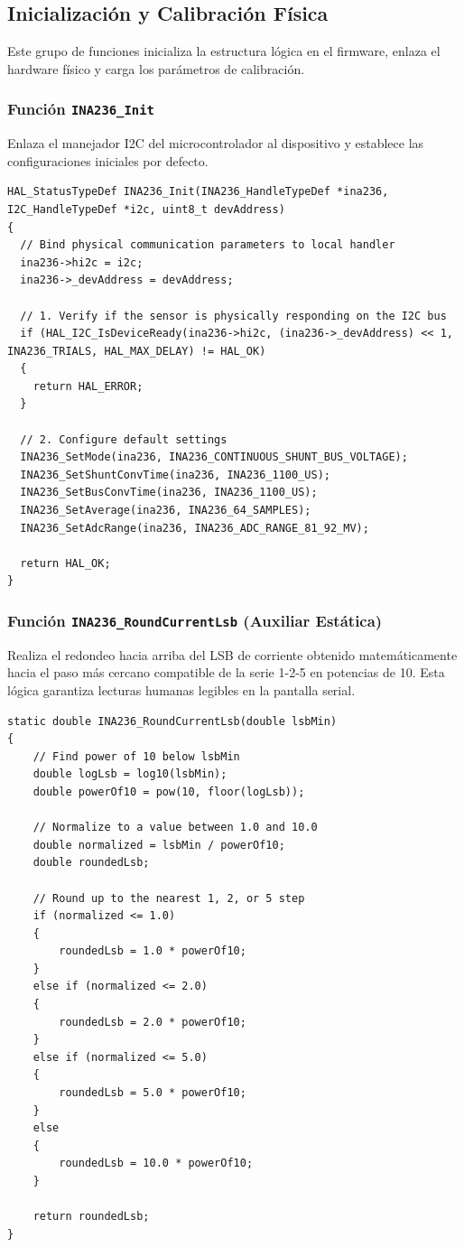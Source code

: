 \documentclass[
10pt, %
a4paper, %
oneside, %
headinclude,footinclude, %
BCOR5mm, %
]{scrartcl}
\begin{document}
\subsection{Inicialización y Calibración Física}
Este grupo de funciones inicializa la estructura lógica en el firmware, enlaza el hardware físico y carga los parámetros de calibración.

\subsubsection{Función \texttt{INA236\_Init}}
Enlaza el manejador I2C del microcontrolador al dispositivo y establece las configuraciones iniciales por defecto.
\begin{lstlisting}[style=CMakeStyle]
HAL_StatusTypeDef INA236_Init(INA236_HandleTypeDef *ina236, I2C_HandleTypeDef *i2c, uint8_t devAddress)
{
  // Bind physical communication parameters to local handler
  ina236->hi2c = i2c;
  ina236->_devAddress = devAddress;

  // 1. Verify if the sensor is physically responding on the I2C bus
  if (HAL_I2C_IsDeviceReady(ina236->hi2c, (ina236->_devAddress) << 1, INA236_TRIALS, HAL_MAX_DELAY) != HAL_OK)
  {
    return HAL_ERROR;
  }

  // 2. Configure default settings
  INA236_SetMode(ina236, INA236_CONTINUOUS_SHUNT_BUS_VOLTAGE);
  INA236_SetShuntConvTime(ina236, INA236_1100_US);
  INA236_SetBusConvTime(ina236, INA236_1100_US);
  INA236_SetAverage(ina236, INA236_64_SAMPLES);
  INA236_SetAdcRange(ina236, INA236_ADC_RANGE_81_92_MV);

  return HAL_OK;
}
\end{lstlisting}

\subsubsection{Función \texttt{INA236\_RoundCurrentLsb} (Auxiliar Estática)}
Realiza el redondeo hacia arriba del LSB de corriente obtenido matemáticamente hacia el paso más cercano compatible de la serie 1-2-5 en potencias de 10. Esta lógica garantiza lecturas humanas legibles en la pantalla serial.
\begin{lstlisting}[style=CMakeStyle]
static double INA236_RoundCurrentLsb(double lsbMin)
{
    // Find power of 10 below lsbMin
    double logLsb = log10(lsbMin);
    double powerOf10 = pow(10, floor(logLsb));
    
    // Normalize to a value between 1.0 and 10.0
    double normalized = lsbMin / powerOf10;
    double roundedLsb;
    
    // Round up to the nearest 1, 2, or 5 step
    if (normalized <= 1.0)
    {
        roundedLsb = 1.0 * powerOf10;
    }
    else if (normalized <= 2.0)
    {
        roundedLsb = 2.0 * powerOf10;
    }
    else if (normalized <= 5.0)
    {
        roundedLsb = 5.0 * powerOf10;
    }
    else
    {
        roundedLsb = 10.0 * powerOf10;
    }
    
    return roundedLsb;
}
\end{lstlisting}
\end{document}
